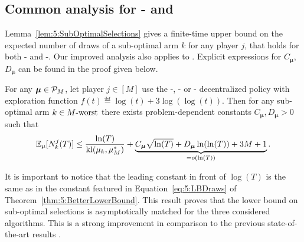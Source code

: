 \subsection{Common analysis for \RandTopM- and \MCTopM}\label{sub:5:UpperBoundSelections}

Lemma~\ref{lem:5:SubOptimalSelections} gives a finite-time upper bound on the expected number of draws of a sub-optimal arm $k$ for any player $j$, that
holds for both \RandTopM-\klUCB{} and \MCTopM-\klUCB.
Our improved analysis also applies to \rhoRand{}.
Explicit expressions for $C_{\boldsymbol{\mu}}$, $D_{\boldsymbol{\mu}}$ can be found in the proof given below.

\begin{lemma}\label{lem:5:SubOptimalSelections}
\begin{leftbar}[lemmabar]  %
  For any $\boldsymbol{\mu}\in\mathcal{P}_M$,
  let player $j\in[M]$ use the \RandTopM-, \MCTopM- or \rhoRand-\klUCB{}
  decentralized policy with exploration function $f(t) \eqdef \log(t) + 3 \log(\log(t))$.
  Then for any sub-optimal arm $k \in M\text{-}\mathrm{worst}$ there exists problem-dependent constants $C_{\boldsymbol{\mu}}, D_{\boldsymbol{\mu}} > 0$ such that
  \begin{equation}\label{eq:5:SubOptimalSelections}
      \mathbb{E}_{\mu}[N_k^j(T)] \leq
      \frac{\ln(T)}{\mathrm{kl}(\mu_k,\mu_{M}^*)}
      + \underbrace{C_{\boldsymbol{\mu}} \sqrt{\ln(T)} + D_{\boldsymbol{\mu}}\ln(\ln(T)) + 3M + 1}_{= \mathop{}\mathopen{}o\mathopen{}\left(\ln(T)\right)}.
  \end{equation}
\end{leftbar}  %
\end{lemma}

It is important to notice that the leading constant in front of $\log(T)$ is the same as in the constant featured in Equation~\eqref{eq:5:LBDraws} of Theorem~\ref{thm:5:BetterLowerBound}. This result proves that the lower bound on sub-optimal selections is asymptotically matched for the three considered algorithms. This is a strong improvement in comparison to the previous state-of-the-art results
\citep{Zhao10,Anandkumar11}.

